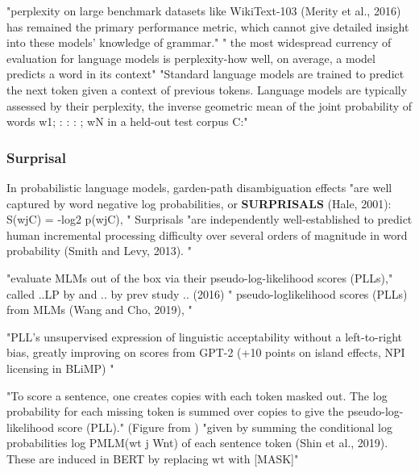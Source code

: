 "perplexity on large benchmark datasets like WikiText-103 (Merity et al., 2016) has remained the primary performance metric, which cannot give detailed insight into these models’ knowledge of grammar." \citep{warstadt2020blimp}
" the most widespread currency of evaluation for language models is perplexity-how well, on average, a model predicts a word in its context" \citep{hu2020systematic}
"Standard language models are trained to predict the next token given a context of previous tokens. Language models are typically assessed by their perplexity, the inverse geometric mean of the joint probability of words w1; : : : ; wN in a held-out test corpus C:" \citep{hu2020systematic}

\subsubsection{Surprisal}

In probabilistic language models, garden-path disambiguation effects "are well captured by word negative log probabilities, or \textbf{SURPRISALS} (Hale, 2001): S(wjC) = -log2 p(wjC), " \citep{hu2020systematic}
Surprisals "are independently well-established to predict human incremental processing difficulty over several orders of magnitude in word probability (Smith and Levy, 2013). " \citep{hu2020systematic}


"evaluate MLMs out of the box via their
pseudo-log-likelihood scores (PLLs)," \citep{salazar2020masked}
called ..LP by \citep{lau2020furiously} and .. by prev study .. (2016)
" pseudo-loglikelihood scores (PLLs) from MLMs (Wang and
Cho, 2019), " \citep{salazar2020masked}

"PLL’s unsupervised expression of linguistic acceptability without a
left-to-right bias, greatly improving on scores
from GPT-2 (+10 points on island effects, NPI
licensing in BLiMP) " \citep{salazar2020masked}

"To score a sentence, one creates copies
with each token masked out. The log probability for
each missing token is summed over copies to give the
pseudo-log-likelihood score (PLL)." (Figure from \citet{salazar2020masked})
"given by summing the conditional log
probabilities log PMLM(wt j Wnt) of each sentence token (Shin et al., 2019). These are induced
in BERT by replacing wt with [MASK]" \citep{salazar2020masked}

